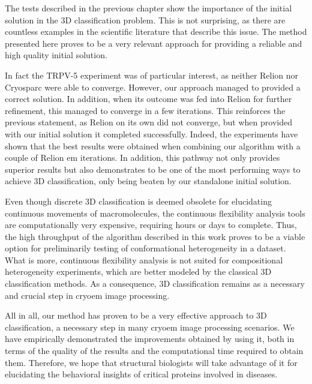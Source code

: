 \documentclass[../main.tex]{subfiles}
\begin{document}
The tests described in the previous chapter show the importance of the initial solution in the 3D classification problem. This is not surprising, as there are countless examples in the scientific literature that describe this issue. The method presented here proves to be a very relevant approach for providing a reliable and high quality initial solution.

In fact the TRPV-5 experiment was of particular interest, as neither Relion nor Cryosparc were able to converge. However, our approach managed to provided a correct solution. In addition, when its outcome was fed into Relion for further refinement, this managed to converge in a few iterations. This reinforces the previous statement, as Relion on its own did not converge, but when provided with our initial solution it completed successfully. Indeed, the experiments have shown that the best results were obtained when combining our algorithm with a couple of Relion \gls{em} iterations. In addition, this pathway not only provides superior results but also demonstrates to be one of the most performing ways to achieve 3D classification, only being beaten by our standalone initial solution.

Even though discrete 3D classification is deemed obsolete for elucidating continuous movements of macromolecules, the continuous flexibility analysis tools are computationally very expensive, requiring hours or days to complete. Thus, the high throughput of the algorithm described in this work proves to be a viable option for preliminarily testing of conformational heterogeneity in a dataset. What is more, continuous flexibility analysis is not suited for compositional heterogeneity experiments, which are better modeled by the classical 3D classification methods. As a consequence, 3D classification remains as a necessary and crucial step in \gls{cryoem} image processing.

All in all, our method has proven to be a very effective approach to 3D classification, a necessary step in many \gls{cryoem} image processing scenarios. We have empirically demonstrated the improvements obtained by using it, both in terms of the quality of the results and the computational time required to obtain them. Therefore, we hope that structural biologists will take advantage of it for elucidating the behavioral insights of critical proteins involved in diseases.
\end{document}
